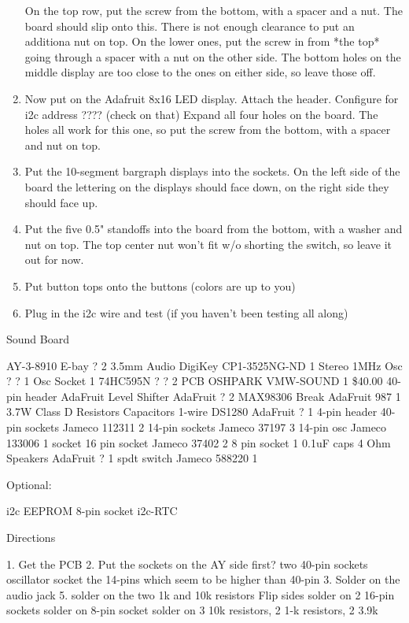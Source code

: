 \documentclass[11pt]{article}
\begin{document}
\begin{enumerate}
	On the top row, put the screw from the bottom, with a spacer and a nut.
	The board should slip onto this.  There is not enough clearance
	to put an additiona nut on top.
	On the lower ones, put the screw in from *the top* going through 
	a spacer with a nut on the other side.
	The bottom holes on the middle display are too close to the ones
	on either side, so leave those off.

\item	Now put on the Adafruit 8x16 LED display.  Attach the header.
	Configure for i2c address ???? (check on that)
	Expand all four holes on the board.
	The holes all work for this one, so put the screw from the bottom,
	with a spacer and nut on top.

\item	Put the 10-segment bargraph displays into the sockets.
	On the left side of the board the lettering on the displays should
	face down, on the right side they should face up.

\item	Put the five 0.5" standoffs into the board from the bottom, with
	a washer and nut on top.  The top center nut won't fit w/o shorting
	the switch, so leave it out for now.

\item	Put button tops onto the buttons (colors are up to you)

\item	Plug in the i2c wire and test (if you haven't been testing all along)
\end{enumerate}

Sound Board

	AY-3-8910	E-bay		?		2
	3.5mm Audio	DigiKey		CP1-3525NG-ND	1
		Stereo
	1MHz Osc	?		?		1
	Osc Socket					1
	74HC595N	?		?		2
	PCB		OSHPARK		VMW-SOUND	1	\$40.00
	40-pin header	AdaFruit
	Level Shifter	AdaFruit	?		2
	MAX98306 Break	AdaFruit	987		1
		3.7W Class D
	Resistors
	Capacitors
	1-wire DS1280	AdaFruit	?		1
	4-pin header
	40-pin sockets	Jameco		112311		2
	14-pin sockets	Jameco		37197		3
	14-pin osc	Jameco		133006		1
		socket
	16 pin socket	Jameco		37402		2
	8 pin socket					1
	0.1uF caps
	4 Ohm Speakers	AdaFruit	?		1
	spdt switch	Jameco		588220		1

	Optional:

	i2c EEPROM
	8-pin socket
	i2c-RTC

Directions

	1. Get the PCB
	2. Put the sockets on the AY side first?
		two 40-pin sockets
		oscillator socket
		the 14-pins which seem to be higher than 40-pin
	3. Solder on the audio jack
	5. solder on the two 1k and 10k resistors
	Flip sides
	solder on 2 16-pin sockets
	solder on 8-pin socket
	solder on 3 10k resistors, 2 1-k resistors, 2 3.9k
\end{document}
